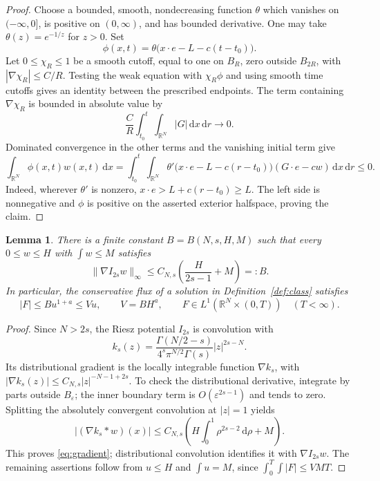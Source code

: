 \documentclass[11pt]{article}
\newtheorem{lemma}[theorem]{Lemma}
\theoremstyle{definition}
\newcommand{\R}{\mathbb R}
\newcommand{\dd}{\,\mathrm d}
\begin{document}
\begin{proof}
Choose a bounded, smooth, nondecreasing function $\theta$ which vanishes on $(-\infty,0]$, is positive on $(0,\infty)$, and has bounded derivative. One may take $\theta(z)=e^{-1/z}$ for $z>0$. Set
\[
 \phi(x,t)=\theta\bigl(x\cdot e-L-c(t-t_0)\bigr).
\]
Let $0\le\chi_R\le1$ be a smooth cutoff, equal to one on $B_R$, zero outside $B_{2R}$, with $|\nabla\chi_R|\le C/R$. Testing the weak equation with $\chi_R\phi$ and using smooth time cutoffs gives an identity between the prescribed endpoints. The term containing $\nabla\chi_R$ is bounded in absolute value by
\[
 \frac{C}{R}\int_{t_0}^t\!\int_{\R^N}|G|\dd x\dd r\longrightarrow0.
\]
Dominated convergence in the other terms and the vanishing initial term give
\begin{equation}\label{eq:halfspace-test}
 \int_{\R^N}\phi(x,t)w(x,t)\dd x
 =\int_{t_0}^t\!\int_{\R^N}
 \theta'\bigl(x\cdot e-L-c(r-t_0)\bigr)
 (G\cdot e-cw)\dd x\dd r\le0.
\end{equation}
Indeed, wherever $\theta'$ is nonzero, $x\cdot e>L+c(r-t_0)\ge L$. The left side is nonnegative and $\phi$ is positive on the asserted exterior halfspace, proving the claim.
\end{proof}

\begin{lemma}\label{lem:gradient}
There is a finite constant $B=B(N,s,H,M)$ such that every $0\le w\le H$ with $\int w\le M$ satisfies
\begin{equation}\label{eq:gradient}
 \|\nabla I_{2s}w\|_\infty
 \le C_{N,s}\left(\frac{H}{2s-1}+M\right)=:B.
\end{equation}
In particular, the conservative flux of a solution in Definition~\ref{def:class} satisfies
\begin{equation}\label{eq:flux}
 |F|\le Bu^{1+a}\le Vu,\qquad V=BH^a,
 \qquad F\in L^1(\R^N\times(0,T))\quad(T<\infty).
\end{equation}
\end{lemma}

\begin{proof}
Since $N>2s$, the Riesz potential $I_{2s}$ is convolution with
\[
 k_s(z)=\frac{\Gamma(N/2-s)}{4^s\pi^{N/2}\Gamma(s)}|z|^{2s-N}.
\]
Its distributional gradient is the locally integrable function $\nabla k_s$, with
$|\nabla k_s(z)|\le C_{N,s}|z|^{-N-1+2s}$. To check the distributional derivative, integrate by parts outside $B_\varepsilon$; the inner boundary term is $O(\varepsilon^{2s-1})$ and tends to zero. Splitting the absolutely convergent convolution at $|z|=1$ yields
\[
 |(\nabla k_s*w)(x)|
 \le C_{N,s}\left(H\int_0^1\rho^{2s-2}\dd\rho+M\right).
\]
This proves \eqref{eq:gradient}; distributional convolution identifies it with $\nabla I_{2s}w$. The remaining assertions follow from $u\le H$ and $\int u=M$, since $\int_0^T\!\int|F|\le VMT$.
\end{proof}
\end{document}
